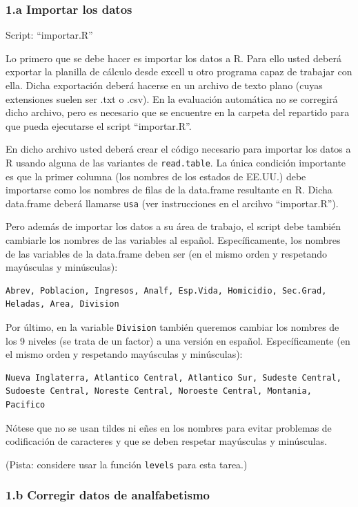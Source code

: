 \documentclass[]{article}
\begin{document}
\subsubsection{1.a Importar los datos}

Script: ``importar.R''

Lo primero que se debe hacer es importar los datos a R. Para ello usted
deberá exportar la planilla de cálculo desde excell u otro programa
capaz de trabajar con ella. Dicha exportación deberá hacerse en un
archivo de texto plano (cuyas extensiones suelen ser .txt o .csv). En la
evaluación automática no se corregirá dicho archivo, pero es necesario
que se encuentre en la carpeta del repartido para que pueda ejecutarse
el script ``importar.R''.

En dicho archivo usted deberá crear el código necesario para importar
los datos a R usando alguna de las variantes de \texttt{read.table}. La
única condición importante es que la primer columna (los nombres de los
estados de EE.UU.) debe importarse como los nombres de filas de la
data.frame resultante en R. Dicha data.frame deberá llamarse
\texttt{usa} (ver instrucciones en el arcihvo ``importar.R'').

Pero además de importar los datos a su área de trabajo, el script debe
también cambiarle los nombres de las variables al español.
Específicamente, los nombres de las variables de la data.frame deben ser
(en el mismo orden y respetando mayúsculas y minúsculas):

\begin{verbatim}
Abrev, Poblacion, Ingresos, Analf, Esp.Vida, Homicidio, Sec.Grad, 
Heladas, Area, Division
\end{verbatim}
Por último, en la variable \texttt{Division} también queremos cambiar
los nombres de los 9 niveles (se trata de un factor) a una versión en
español. Específicamente (en el mismo orden y respetando mayúsculas y minúsculas):

\begin{verbatim}
Nueva Inglaterra, Atlantico Central, Atlantico Sur, Sudeste Central,
Sudoeste Central, Noreste Central, Noroeste Central, Montania, Pacifico
\end{verbatim}
Nótese que no se usan tildes ni eñes en los nombres para evitar
problemas de codificación de caracteres y que se deben respetar
mayúsculas y minúsculas.

(Pista: considere usar la función \texttt{levels} para esta tarea.)

\subsubsection{1.b Corregir datos de analfabetismo}
\end{document}
